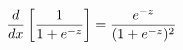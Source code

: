 \documentclass[preview]{standalone}
\begin{document}
\begin{align*}
\special{dvisvgm:raw <g id='unique000'>}\frac{d}{dx}\left[\frac{1}{1+e^{-z}}\right]=\frac{e^{-z}}{(1+e^{-z})^2}\special{dvisvgm:raw </g>}
\end{align*}
\end{document}
